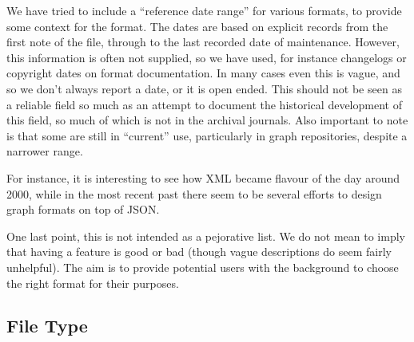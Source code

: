 \documentclass{sig-alternate}
\begin{document}
We have tried to include a ``reference date range'' for various
formats, to provide some context for the format. The dates are based
on explicit records from the first note of the file, through to the
last recorded date of maintenance. However, this information is often
not supplied, so we have used, for instance changelogs or copyright
dates on format documentation. In many cases even this is vague, and
so we don't always report a date, or it is open ended. This should not
be seen as a reliable field so much as an attempt to document the
historical development of this field, so much of which is not in the
archival journals. Also important to note is that some are still in
``current'' use, particularly in graph repositories, despite a
narrower range.

For instance, it is interesting to see how XML became flavour of the
day around 2000, while in the most recent past there seem to be
several efforts to design graph formats on top of JSON. 

One last point, this is not intended as a pejorative list. We do not
mean to imply that having a feature is good or bad (though vague
descriptions do seem fairly unhelpful). The aim is to provide
potential users with the background to choose the right format for
their purposes.

\subsection{File Type}
\end{document}
